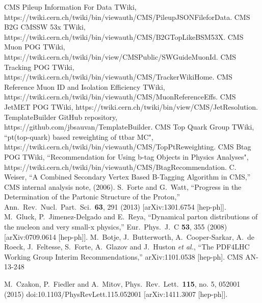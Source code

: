 \documentclass{cmspaperpdf}
\begin{document}
\begin{thebibliography}{9}
    
  CMS Pileup Information For Data TWiki, https://twiki.cern.ch/twiki/bin/viewauth/CMS/PileupJSONFileforData.
  CMS B2G CMSSW 53x TWiki, https://twiki.cern.ch/twiki/bin/viewauth/CMS/B2GTopLikeBSM53X.
  CMS Muon POG TWiki, https://twiki.cern.ch/twiki/bin/view/CMSPublic/SWGuideMuonId.
  CMS Tracking POG TWiki, https://twiki.cern.ch/twiki/bin/viewauth/CMS/TrackerWikiHome.
  CMS Reference Muon ID and Isolation Efficiency TWiki, https://twiki.cern.ch/twiki/bin/viewauth/CMS/MuonReferenceEffs.
  CMS JetMET POG TWiki, https://twiki.cern.ch/twiki/bin/view/CMS/JetResolution.
  TemplateBuilder GitHub repository, https://github.com/jbsauvan/TemplateBuilder.
  CMS Top Quark Group TWiki, ``pt(top-quark) based reweighting of ttbar MC", https://twiki.cern.ch/twiki/bin/viewauth/CMS/TopPtReweighting.
  CMS Btag POG TWiki, ``Recommendation for Using b-tag Objects in Physics Analyses", https://twiki.cern.ch/twiki/bin/viewauth/CMS/BtagRecommendation.
  C. Weiser, ``A Combined Secondary Vertex Based B-Tagging Algorithm in CMS,'' CMS internal analysis note, (2006).
  S.~Forte and G.~Watt,
  ``Progress in the Determination of the Partonic Structure of the Proton,''
  Ann.\ Rev.\ Nucl.\ Part.\ Sci.\  {\bf 63}, 291 (2013)
  [arXiv:1301.6754 [hep-ph]].
  M.~Gluck, P.~Jimenez-Delgado and E.~Reya,
  ``Dynamical parton distributions of the nucleon and very small-x physics,''
  Eur.\ Phys.\ J.\ C {\bf 53}, 355 (2008)
  [arXiv:0709.0614 [hep-ph]].
  M.~Botje, J.~Butterworth, A.~Cooper-Sarkar, A.~de Roeck, J.~Feltesse, S.~Forte, A.~Glazov and J.~Huston {\it et al.},
  ``The PDF4LHC Working Group Interim Recommendations,''
  arXiv:1101.0538 [hep-ph].
  CMS AN-13-248

  M.~Czakon, P.~Fiedler and A.~Mitov,
  Phys.\ Rev.\ Lett.\  {\bf 115}, no. 5, 052001 (2015)
  doi:10.1103/PhysRevLett.115.052001
  [arXiv:1411.3007 [hep-ph]].




\end{thebibliography}
\end{document}
